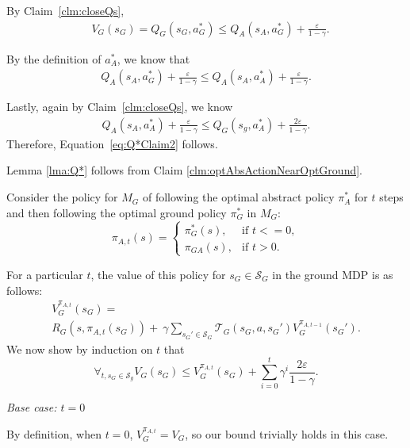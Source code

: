 By Claim~\ref{clm:closeQs},
\begin{align}
&V_G(s_G) = Q_G(s_G, a^*_G) \leq Q_A(s_A, a^*_G) + \frac{\varepsilon}{1-\gamma}.
\label{eq:Q*OptActionResult}
\end{align}

By the definition of $a^*_A$, we know that 
\begin{align}
Q_A(s_A, a^*_G) + \frac{\varepsilon}{1-\gamma} \leq Q_A(s_A, a^*_A) + \frac{\varepsilon}{1-\gamma}.
\end{align}

Lastly, again by Claim~\ref{clm:closeQs}, we know
\begin{align}
Q_A(s_A, a^*_A) + \frac{\varepsilon}{1-\gamma} \leq Q_G(s_g, a^*_A) + \frac{2\varepsilon}{1-\gamma}.
\end{align}
Therefore, Equation~\ref{eq:Q*Claim2} follows.

\begin{clm}
Lemma \ref{lma:Q*} follows from Claim \ref{clm:optAbsActionNearOptGround}.
\label{clm:lmaFromClm}
\end{clm}

Consider the policy for $M_G$ of following the optimal abstract policy $\pi^*_A$ for $t$ steps and then following the optimal ground policy $\pi^*_G$ in $M_G$:
\begin{equation}
\pi_{A,t}(s)=
\begin{cases}
\pi_G^*(s), &\text{if } t<=0,\\
\pi_{GA}(s), &\text{if } t > 0.
\end{cases}
\end{equation}

For a particular $t$, the value of this policy for $s_G \in \mathcal{S}_G$ in the ground \ac{MDP} is as follows:
\begin{multline*}
V_G^{\pi_{A,t}}(s_G) = \\
R_G(s, \pi_{A,t}(s_G)) +\ \gamma \sum_{{s_G}' \in \mathcal{S}_G}\mathcal{T}_G(s_G, a, {s_G}')V_G^{\pi_{A,t-1}}({s_G}').
\end{multline*}
We now show by induction on $t$ that
\begin{equation}
\forall_{t, s_G \in \mathcal{S}_g} V_G(s_G) \leq  V_G^{\pi_{A,t}}(s_G) + \sum_{i=0}^{t}\gamma^i \frac{2\varepsilon}{1-\gamma}.
\end{equation}

\textit{Base case: $t=0$}

By definition, when $t=0$, $V_G^{\pi_{A,t}} = V_G$, so our bound trivially holds in this case.

